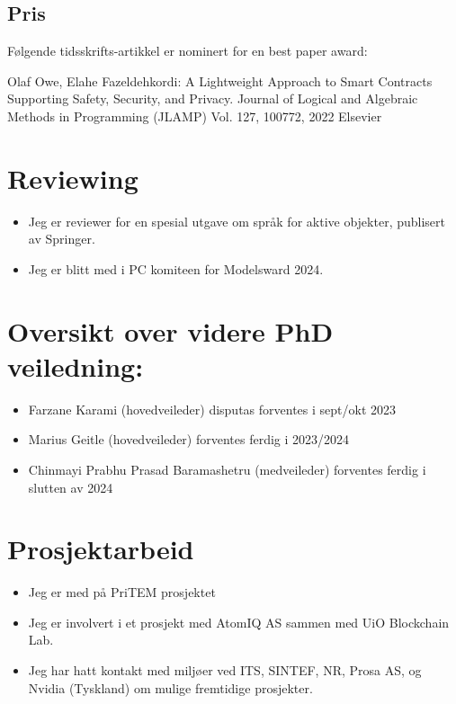 \documentclass[11pt]{article}
\begin{document}
\subsection{Pris}
\label{sec-3-2}

Følgende tidsskrifts-artikkel er nominert for en best paper award:

Olaf Owe, Elahe Fazeldehkordi: A Lightweight Approach to Smart Contracts Supporting Safety, Security, and
Privacy.  Journal of Logical and Algebraic Methods in Programming (JLAMP) Vol. 127, 100772, 2022 Elsevier 
\section{Reviewing}
\label{sec-4}
\begin{itemize}
\item Jeg  er reviewer for en spesial utgave 
om språk for aktive objekter, publisert av Springer.
\item Jeg er blitt med i PC komiteen for Modelsward 2024.
\end{itemize}

\section{Oversikt over videre PhD veiledning:}
\label{sec-5}

\begin{itemize}
\item Farzane Karami  (hovedveileder) disputas forventes i sept/okt  2023
\item Marius Geitle  (hovedveileder) forventes ferdig i 2023/2024
\item Chinmayi Prabhu Prasad Baramashetru  (medveileder) forventes ferdig
i slutten av 2024
\end{itemize}

\section{Prosjektarbeid}
\label{sec-6}
\begin{itemize}
\item Jeg er med på PriTEM prosjektet
\end{itemize}

\begin{itemize}
\item Jeg er involvert i et prosjekt med AtomIQ AS sammen med UiO Blockchain Lab.

\item Jeg har hatt kontakt med miljøer ved 
ITS, SINTEF, NR, Prosa AS, og Nvidia (Tyskland)
om mulige fremtidige prosjekter.
\end{itemize}
\end{document}
